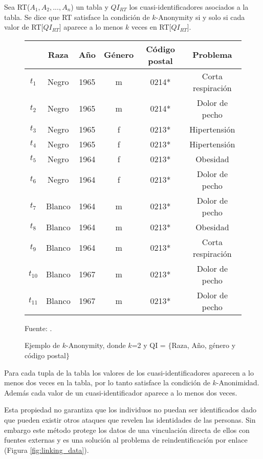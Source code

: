 \begin{definicion}[$k$-Anonimidad]
Sea RT($A_{1}, A_{2}, ..., A_{n}$) un tabla y $QI_{RT}$ los cuasi-identificadores asociados a la tabla. Se dice que RT satisface la condición de $k$-Anonymity si y solo si cada valor de RT[$QI_{RT}$] aparece a lo menos $k$ veces en RT[$QI_{RT}$].
\end{definicion}

\begin{figure}[h]
    \centering
    \begin{tabular}{|c|c|c|c|c|c|}
        \hline
        & Raza & Año & Género & Código postal & Problema \\
        \hline
        $t_{1}$ & Negro & 1965 & m & 0214* & Corta respiración \\
        \hline
        $t_{2}$ & Negro & 1965 & m & 0214* & Dolor de pecho \\
        \hline
        $t_{3}$ & Negro & 1965 & f & 0213* & Hipertensión \\
        \hline
        $t_{4}$ & Negro & 1965 & f & 0213* & Hipertensión \\
        \hline
        $t_{5}$ & Negro & 1964 & f & 0213* & Obesidad \\
        \hline
        $t_{6}$ & Negro & 1964 & f & 0213* & Dolor de pecho \\
        \hline
        $t_{7}$ & Blanco & 1964 & m & 0213* & Dolor de pecho \\
        \hline
        $t_{8}$ & Blanco & 1964 & m & 0213* & Obesidad \\
        \hline
        $t_{9}$ & Blanco & 1964 & m & 0213* & Corta respiración \\
        \hline
        $t_{10}$ & Blanco & 1967 & m & 0213* & Dolor de pecho \\
        \hline
        $t_{11}$ & Blanco & 1967 & m & 0213* & Dolor de pecho \\
        \hline
    \end{tabular}
    \caption{\label{table:original} Ejemplo de $k$-Anonymity, donde $k$=2 y QI = $\lbrace$Raza, Año, género y código postal$\rbrace$} Fuente: \cite{sweeney2002k}.
\end{figure}

Para cada tupla de la tabla los valores de los cuasi-identificadores aparecen a lo menos dos veces en la tabla, por lo tanto satisface la condición de $k$-Anonimidad. Además cada valor de un cuasi-identificador aparece a lo menos dos veces.

Esta propiedad no garantiza que los individuos no puedan ser identificados dado que pueden existir otros ataques que revelen las identidades de las personas. Sin embargo este método protege los datos de una vinculación directa de ellos con fuentes externas y es una solución al problema de reindentificación por enlace (Figura \ref{fig:linking_data}).

